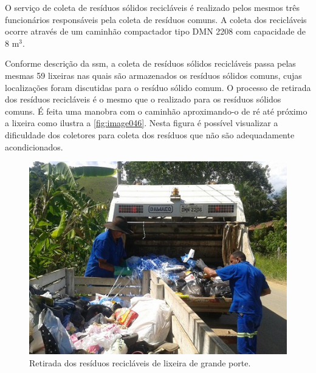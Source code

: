 O serviço de coleta de resíduos sólidos recicláveis é realizado pelos mesmos três funcionários responsáveis pela coleta de resíduos comuns. A coleta dos recicláveis ocorre através de um caminhão compactador tipo DMN 2208 com capacidade de 8 m$^{3}$.

Conforme descrição da \gls{ssm}, a coleta de resíduos sólidos recicláveis passa pelas mesmas 59 lixeiras nas quais são armazenados os resíduos sólidos comuns, cujas localizações foram discutidas para o resíduo sólido comum.
O processo de retirada dos resíduos recicláveis é o mesmo que o realizado para os resíduos sólidos comuns. É feita uma manobra com o caminhão aproximando-o de ré até próximo a lixeira como ilustra a \autoref{fig:image046}. Nesta figura é possível visualizar a dificuldade dos coletores para coleta dos resíduos que não são adequadamente acondicionados.

\begin{figure}
	\centering
	\includegraphics[width=0.7\linewidth]{produtos/prodtres/image046}
	\caption{Retirada dos resíduos recicláveis de lixeira de grande porte.}
	\label{fig:image046}
\end{figure}



